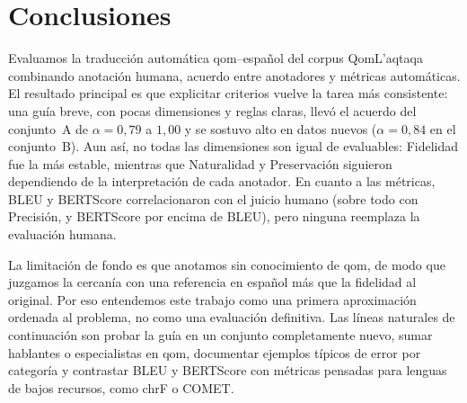 \section{Conclusiones}
\label{sec:conclusiones}

Evaluamos la traducción automática qom--español del corpus QomL'aqtaqa combinando
anotación humana, acuerdo entre anotadores y métricas automáticas. El resultado
principal es que explicitar criterios vuelve la tarea más consistente: una guía
breve, con pocas dimensiones y reglas claras, llevó el acuerdo del conjunto~A de
$\alpha=0{,}79$ a $1{,}00$ y se sostuvo alto en datos nuevos ($\alpha=0{,}84$ en
el conjunto~B). Aun así, no todas las dimensiones son igual de evaluables:
Fidelidad fue la más estable, mientras que Naturalidad y Preservación siguieron
dependiendo de la interpretación de cada anotador. En cuanto a las métricas, BLEU
y BERTScore correlacionaron con el juicio humano (sobre todo con Precisión, y
BERTScore por encima de BLEU), pero ninguna reemplaza la evaluación humana.

La limitación de fondo es que anotamos sin conocimiento de qom, de modo que
juzgamos la cercanía con una referencia en español más que la fidelidad al
original. Por eso entendemos este trabajo como una primera aproximación ordenada
al problema, no como una evaluación definitiva. Las líneas naturales de
continuación son probar la guía en un conjunto completamente nuevo, sumar
hablantes o especialistas en qom, documentar ejemplos típicos de error por
categoría y contrastar BLEU y BERTScore con métricas pensadas para lenguas de
bajos recursos, como chrF o COMET.
